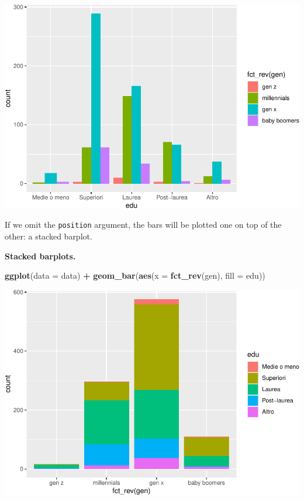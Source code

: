 \documentclass[
]{book}
\newenvironment{Shaded}{\begin{snugshade}}{\end{snugshade}}
\newcommand{\AttributeTok}[1]{\textcolor[rgb]{0.13,0.29,0.53}{#1}}
\newcommand{\FunctionTok}[1]{\textcolor[rgb]{0.13,0.29,0.53}{\textbf{#1}}}
\newcommand{\NormalTok}[1]{#1}
\newcommand{\SpecialCharTok}[1]{\textcolor[rgb]{0.81,0.36,0.00}{\textbf{#1}}}
\begin{document}
\includegraphics{R-for-social-research-and-business-analytics_files/figure-latex/unnamed-chunk-38-1.pdf}

If we omit the \texttt{position} argument, the bars will be plotted one on top of the other: a stacked barplot.

\textbf{Stacked barplots.}

\begin{Shaded}
\begin{Highlighting}[]
\FunctionTok{ggplot}\NormalTok{(}\AttributeTok{data =}\NormalTok{ data) }\SpecialCharTok{+}
  \FunctionTok{geom\_bar}\NormalTok{(}\FunctionTok{aes}\NormalTok{(}\AttributeTok{x =} \FunctionTok{fct\_rev}\NormalTok{(gen), }\AttributeTok{fill =}\NormalTok{ edu))}
\end{Highlighting}
\end{Shaded}

\includegraphics{R-for-social-research-and-business-analytics_files/figure-latex/unnamed-chunk-39-1.pdf}
\end{document}
